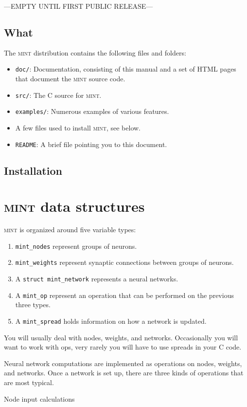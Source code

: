 \documentclass[12pt,letterpaper]{memoir}
\newcommand{\mint}{{\scshape\sffamily mint}\xspace}
\begin{document}
---EMPTY UNTIL FIRST PUBLIC RELEASE--- 

\section{What}

The \mint distribution contains the following files and folders:
\begin{itemize}
\item \lstinline{doc/}: Documentation, consisting of this manual and a
  set of HTML pages that document the \mint source code.
\item \lstinline{src/}: The C source for \mint.
\item \lstinline{examples/}: Numerous examples of various features.
\item A few files used to install \mint, see below.
\item \lstinline{README}: A brief file pointing you to this document.
\end{itemize}

\section{Installation}


\chapter{\mint data structures}
\label{cha:mint-data-structures}

\mint is organized around five variable types:
\begin{enumerate}
\item \lstinline{mint_nodes} represent groups of neurons.
\item \lstinline{mint_weights} represent synaptic connections between
  groups of neurons.
\item A \lstinline{struct mint_network} represents a neural networks.
\item A \lstinline{mint_op} represent an operation that can be
  performed on the previous three types.
\item A \lstinline{mint_spread} holds information on how a network is
  updated.
\end{enumerate}
You will usually deal with nodes, weights, and networks. Occasionally
you will want to work with ops, very rarely you will have to use
spreads in your C code.

Neural network computations are implemented as operations on nodes,
weights, and networks. Once a network is set up, there are three kinds
of operations that are most typical.
\begin{description}
\item[Node input calculations]  
\end{description}
\end{document}
